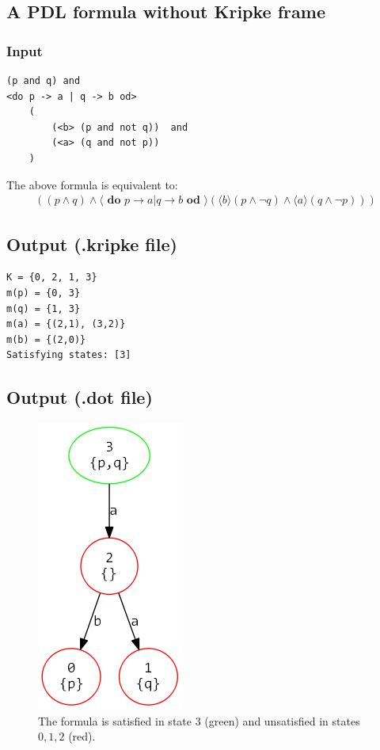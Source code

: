 \documentclass[12pt,a4paper]{article}
\begin{document}
\subsection{A PDL formula without Kripke frame}

\subsubsection*{Input}
\begin{verbatim}
(p and q) and
<do p -> a | q -> b od>
    (
        (<b> (p and not q))  and
        (<a> (q and not p))
    )
\end{verbatim}
The above formula is equivalent to:
\begin{align*}
((p \wedge q) \wedge \langle\textbf{ do }p \rightarrow a \vert q \rightarrow b\textbf{ od }\rangle(\langle b\rangle(p \wedge \neg q) \wedge \langle a \rangle(q \wedge \neg p)))
\end{align*}
\subsection*{Output (.kripke file)}
\begin{verbatim}
K = {0, 2, 1, 3}
m(p) = {0, 3}
m(q) = {1, 3}
m(a) = {(2,1), (3,2)}
m(b) = {(2,0)}
Satisfying states: [3]
\end{verbatim}
\subsection*{Output (.dot file)}

\begin{figure}[H]
\center
\includegraphics[scale=0.4]{example1.png}

\caption{The formula is satisfied in state $3$ (green) and unsatisfied in states $0, 1, 2$ (red). }
\end{figure}
\end{document}
